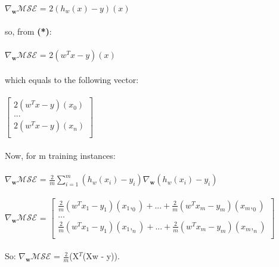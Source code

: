 \documentclass{article}
\begin{document}
$\nabla_{\!\mathbf{w}}\mathcal{MSE} $ = $2(h_w(x) - y)$$(x)$ \\ \\ 
so, from \textbf{(*)}:\\ \\
$\nabla_{\!\mathbf{w}}\mathcal{MSE} $ = $2(w^Tx - y)$$(x)$   \\ \\ 
which equals to the following vector: \\ \\
$
\begin{bmatrix}
2(w^Tx - y)(x_0)\\
. . .\\             
2(w^Tx - y)(x_n)\\
\end{bmatrix}
$ \\ \\
Now, for m training instances: \\ \\ 
$\nabla_{\!\mathbf{w}}\mathcal{MSE} $ = $\frac{2}{m}\sum_{i=1}^{m}(h_w(x_i) - y_i)\nabla_{\!\mathbf{w}}$$(h_w(x_i) - y_i)$ \\ \\
$\nabla_{\!\mathbf{w}}\mathcal{MSE} $ = $\begin{bmatrix}
\frac{2}{m}(w^Tx_1 - y_1)(x_1,_0) + ... + \frac{2}{m}(w^Tx_m - y_m)(x_m,_0) \\
. . .\\             
\frac{2}{m}(w^Tx_1 - y_1)(x_1,_n) + ... + \frac{2}{m}(w^Tx_m - y_m)(x_m,_n)\\
\end{bmatrix}
$ \\ \\ 
So: $\nabla_{\!\mathbf{w}}\mathcal{MSE} $ = $\frac{2}{m}$(X$^T$(Xw - y)).
\end{document}
